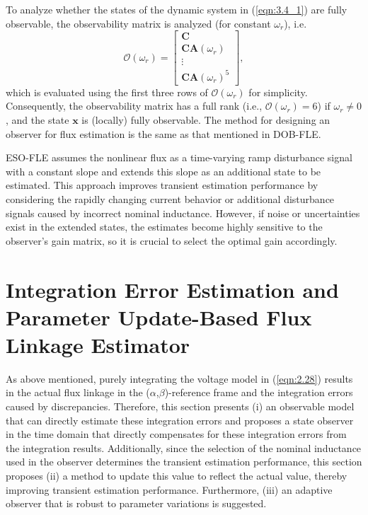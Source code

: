 To analyze whether the states of the dynamic system in (\ref{eqn:3.4_1}) are fully observable, the observability matrix is analyzed (for constant $\omega_r$), i.e.
\begin{equation}\label{eqn:3.6_1}
\mathbf{\mathcal{O}}(\omega_r) = \begin{bmatrix}
\mathbf{C} \\
\mathbf{CA}(\omega_r) \\
\vdots \\
\mathbf{CA}(\omega_r)^5
\end{bmatrix},
\end{equation}
which is evaluated using the first three rows of $\mathbf{\mathcal{O}}(\omega_r)$ for simplicity. Consequently, the observability matrix has a full rank (i.e., $\mathbf{\mathcal{O}}(\omega_r) = 6$) if $\omega_r \neq 0$, and the state $\mathbf{x}$ is (locally) fully observable. The method for designing an observer for flux estimation is the same as that mentioned in DOB-FLE.

ESO-FLE assumes the nonlinear flux as a time-varying ramp disturbance signal with a constant slope and extends this slope as an additional state to be estimated. This approach improves transient estimation performance by considering the rapidly changing current behavior or additional disturbance signals caused by incorrect nominal inductance. However, if noise or uncertainties exist in the extended states, the estimates become highly sensitive to the observer's gain matrix, so it is crucial to select the optimal gain accordingly.

\section{Integration Error Estimation and Parameter Update-Based Flux Linkage Estimator} \label{sec3:3.2.1}
As above mentioned, purely integrating the voltage model in (\ref{eqn:2.28}) results in the actual flux linkage in the ($\alpha$,$\beta$)-reference frame and the integration errors caused by discrepancies. Therefore, this section presents (i) an observable model that can directly estimate these integration errors and proposes a state observer in the time domain that directly compensates for these integration errors from the integration results. Additionally, since the selection of the nominal inductance used in the observer determines the transient estimation performance, this section proposes (ii) a method to update this value to reflect the actual value, thereby improving transient estimation performance. Furthermore, (iii) an adaptive observer that is robust to parameter variations is suggested.

